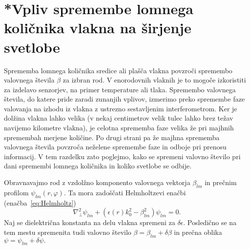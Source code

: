 \section{*Vpliv spremembe lomnega količnika vlakna na širjenje svetlobe}
Sprememba lomnega količnika sredice ali plašča vlakna povzroči spremembo
valovnega števila $\beta$ za izbran rod. V enorodovnih vlaknih je to
mogoče izkoristiti za izdelavo senzorjev, na primer temperature ali
tlaka. Spremembo valovnega števila, do katere pride zaradi zunanjih vplivov,
izmerimo preko spremembe faze valovanja na izhodu iz vlakna
z ustrezno sestavljenim interferometrom. Ker je dolžina vlakna lahko
velika (v nekaj centimetrov velik tulec lahko brez težav navijemo
kilometre vlakna), je celotna sprememba faze velika že pri majhnih
spremembah merjene količine. Po drugi strani pa že majhna sprememba 
valovnega števila povzroča neželene spremembe faze in odboje pri prenosu 
informacij.
V tem razdelku zato poglejmo, kako se spremeni valovno število pri
dani spremembi lomnega količnika in koliko svetlobe se odbije.

Obravnavajmo rod z vzdolžno komponento valovnega vektorja $\beta_{lm}$ in prečnim
profilom $\psi_{lm}\left(r,\varphi\right).$ Ta mora zadoščati Helmholtzevi enačbi 
(enačba~\ref{eq:Helmholtz})
\begin{equation}
\nabla_{\bot}^{2}\psi_{lm}+\left(\epsilon(r)k_{0}^{2}-\beta_{lm}^{2}\right)\psi_{lm}=0.
\label{9.22}
\end{equation}
Naj se dielektrična konstanta na delu vlakna spremeni za $\delta\epsilon.$
Posledično se na tem mestu spremenita tudi valovno število $\beta=\beta_{lm}+\delta\beta$
in prečna oblika $\psi=\psi_{lm}+\delta\psi.$ 

